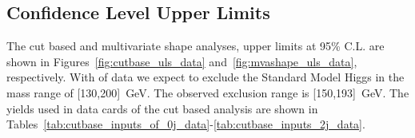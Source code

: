 
\subsection{Confidence Level Upper Limits}
The cut based and multivariate shape analyses, upper limits at 95\% C.L. are shown 
in Figures~\ref{fig:cutbase_uls_data} and~\ref{fig:mvashape_uls_data}, respectively. 
With \intlumi of data we expect to exclude the Standard Model Higgs in the mass range of
[130,200]~GeV. The observed exclusion range is [150,193]~GeV.
The yields used in data cards of the cut based analysis are shown in
Tables~\ref{tab:cutbase_inputs_of_0j_data}-\ref{tab:cutbase_inputs_2j_data}. 

